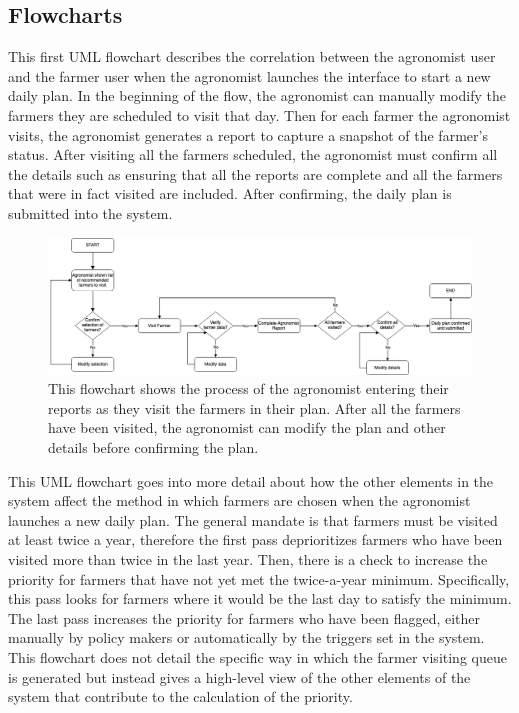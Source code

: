 \subsection{Flowcharts}
\begin{flushleft}
This first UML flowchart describes the correlation between the agronomist user and the farmer user when the agronomist launches the interface to start a new daily plan. In the beginning of the flow, the agronomist can manually modify the farmers they are scheduled to visit that day. Then for each farmer the agronomist visits, the agronomist generates a report to capture a snapshot of the farmer's status. After visiting all the farmers scheduled, the agronomist must confirm all the details such as ensuring that all the reports are complete and all the farmers that were in fact visited are included. After confirming, the daily plan is submitted into the system.
\end{flushleft}



\begin{figure}[hbt!]
\includegraphics[scale=0.4]{../images_diagrams/agronomistexecutesplan.png}

\caption{\label{fig:addOne{figure_counter}}This flowchart shows the process of the agronomist entering their reports as they visit the farmers in their plan. After all the farmers have been visited, the agronomist can modify the plan and other details before confirming the plan.}


\end{figure}

\begin{flushleft}
This UML flowchart goes into more detail about how the other elements in the system affect the method in which farmers are chosen when the agronomist launches a new daily plan. The general mandate is that farmers must be visited at least twice a year, therefore the first pass deprioritizes farmers who have been visited more than twice in the last year. Then, there is a check to increase the priority for farmers that have not yet met the twice-a-year minimum. Specifically, this pass looks for farmers where it would be the last day to satisfy the minimum. The last pass increases the priority for farmers who have been flagged, either manually by policy makers or automatically by the triggers set in the system. This flowchart does not detail the specific way in which the farmer visiting queue is generated but instead gives a high-level view of the other elements of the system that contribute to the calculation of the priority. 
\end{flushleft}

